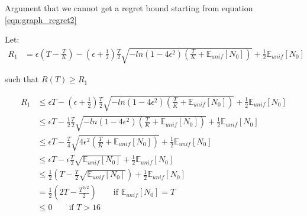 \documentclass{article}
\newcommand{\E}{\mathbb E}
\newcommand{\eqn}[1]{\begin{align}#1\end{align}}
\newcommand{\Eu}[1]{\E_{unif}\left[ #1 \right]}
\theoremstyle{plain}
\theoremstyle{definition}
\begin{document}
Argument that we cannot get a regret bound starting from equation \ref{eqn:graph_regret2}

Let: 
\eqn {
R_1 &= \epsilon(T - \frac{T}{K})-(\epsilon+\frac{1}{2})\frac{T}{2}\sqrt{-ln(1-4\epsilon^2)(\frac{T}{K}+\Eu{N_0})} +\frac{1}{2}\Eu{N_0} 
}

such that  $R(T) \geq R_1$ 

\eqn {
R_1 & \leq \epsilon T-(\epsilon+\frac{1}{2})\frac{T}{2}\sqrt{-ln(1-4\epsilon^2)(\frac{T}{K}+\Eu{N_0})} +\frac{1}{2}\Eu{N_0} \\
& \leq \epsilon T-\frac{1}{2}\frac{T}{2}\sqrt{-ln(1-4\epsilon^2)(\frac{T}{K}+\Eu{N_0})} +\frac{1}{2}\Eu{N_0} \\
& \leq \epsilon T-\frac{T}{4}\sqrt{4\epsilon^2(\frac{T}{K}+\Eu{N_0})} +\frac{1}{2}\Eu{N_0} \\
& \leq \epsilon T-\epsilon\frac{T}{2}\sqrt{\Eu{N_0}} +\frac{1}{2}\Eu{N_0} \\
& \leq \frac{1}{2}\left(T-\frac{T}{2}\sqrt{\Eu{N_0}}\right) +\frac{1}{2}\Eu{N_0} \\
&= \frac{1}{2}\left(2T-\frac{T^{3/2}}{2}\right) \qquad \text{if $\Eu{N_0} = T$}\\ 
& \leq 0 \qquad \text{if $T > 16$}
}
\end{document}
